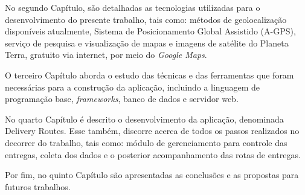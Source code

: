 No segundo Capítulo, são detalhadas as tecnologias utilizadas para o desenvolvimento do presente trabalho, tais como: métodos de geolocalização disponíveis atualmente, Sistema de Posicionamento Global Assistido (A-GPS), serviço de pesquisa e visualização de mapas e imagens de satélite do Planeta Terra, gratuito via internet, por meio do \textit{Google Maps}.

O terceiro Capítulo aborda o estudo das técnicas e das ferramentas que foram necessárias para a construção da aplicação, incluindo a linguagem de programação base, \textit{frameworks}, banco de dados e servidor web.

No quarto Capítulo é descrito o desenvolvimento da aplicação, denominada Delivery Routes. Esse também, discorre acerca de todos os passos realizados no decorrer do trabalho, tais como: módulo de gerenciamento para controle das entregas, coleta dos dados e o posterior acompanhamento das rotas de entregas.

Por fim, no quinto Capítulo são apresentadas as conclusões e as propostas para futuros trabalhos.